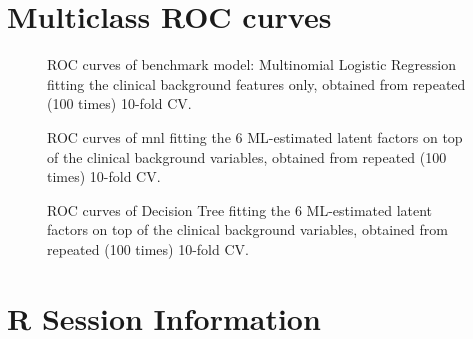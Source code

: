 \documentclass{amsart}
\begin{document}
\section{Multiclass ROC curves} \label{appendixA}
\begin{figure}[htb]
  
  \caption{ROC curves of benchmark model: Multinomial Logistic Regression fitting the clinical background features only, obtained from repeated (100 times) 10-fold CV.}
  \label{roc:bench}
\end{figure}
\begin{figure}[htb]

\caption{ROC curves of \acrlong*{mnl} fitting the 6 ML-estimated latent factors on top of the clinical background variables, obtained from repeated (100 times) 10-fold CV.}
\label{roc:mlr6}
\end{figure}
\newpage
\begin{figure}[htb]

\caption{ROC curves of Decision Tree fitting the 6 ML-estimated latent factors on top of the clinical background variables, obtained from repeated (100 times) 10-fold CV.}
\label{roc:tree}
\end{figure}

\clearpage  
\section{R Session Information} \label{appendixB}
\end{document}
